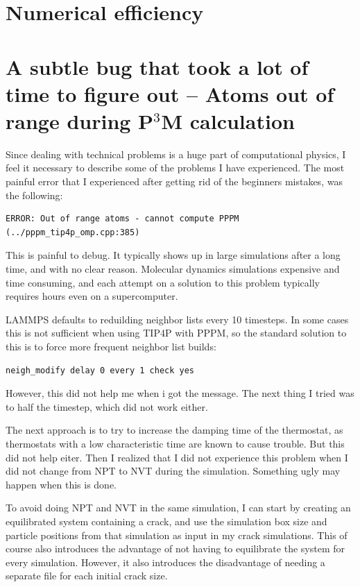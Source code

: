\section{Numerical efficiency}

\section{A subtle bug that took a lot of time to figure out -- Atoms out of range during P$^3$M calculation}

Since dealing with technical problems is a huge part of computational physics, I feel it necessary to describe some of the problems I have experienced. The most painful error that I experienced after getting rid of the beginners mistakes, was the following:

\begin{verbatim}
ERROR: Out of range atoms - cannot compute PPPM (../pppm_tip4p_omp.cpp:385)
\end{verbatim}

This is painful to debug. It typically shows up in large simulations after a long time, and with no clear reason. Molecular dynamics simulations expensive and time consuming, and each attempt on a solution to this problem typically requires hours even on a supercomputer. 

LAMMPS defaults to reduilding neighbor lists every 10 timesteps. In some cases this is not sufficient when using TIP4P with PPPM, so the standard solution to this is to force more frequent neighbor list builds:

\begin{lstlisting}[language=LammpsInput]
neigh_modify delay 0 every 1 check yes
\end{lstlisting}

However, this did not help me when i got the message. The next thing I tried was to half the timestep, which did not work either.

The next approach is to try to increase the damping time of the thermostat, as thermostats with a low characteristic time are known to cause trouble. But this did not help eiter. Then I realized that I did not experience this problem when I did not change from NPT to NVT during the simulation. Something ugly may happen when this is done.

To avoid doing NPT and NVT in the same simulation, I can start by creating an equilibrated system containing a crack, and use the simulation box size and particle positions from that simulation as input in my crack simulations. This of course also introduces the advantage of not having to equilibrate the system for every simulation. However, it also introduces the disadvantage of needing a separate file for each initial crack size.

